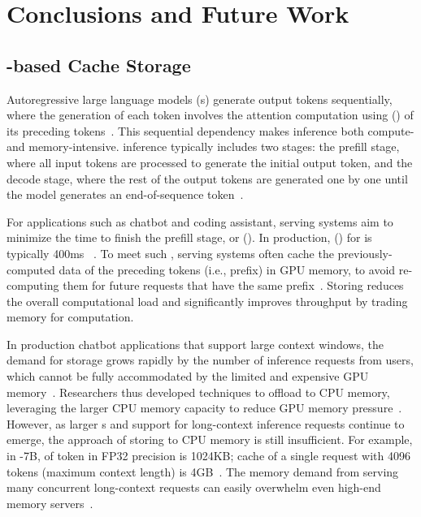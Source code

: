 \chapter{Conclusions and Future Work}
\label{chap:future}

\section{\cxl-based \kv Cache Storage}
\label{sec:cxlkv}

Autoregressive large language models (\llm{}s) generate output tokens sequentially, where the generation of each token involves the attention computation using \kvfull (\kv) of its preceding tokens~\cite{gpt1, gpt2, gpt3}. 
This sequential dependency makes \llm inference both compute- and memory-intensive.
\llm inference typically includes two stages: the prefill stage, where all input tokens are processed to generate the initial output token, and the decode stage, where the rest of the output tokens are generated one by one until the model generates an end-of-sequence token~\cite{agrawal2023sarathi,distserve,patel2024splitwise}. 


For applications such as chatbot and coding assistant, \llm serving systems aim to minimize the time to finish the prefill stage, or \ttftfull (\ttft).
In production, \slofull (\slo) for \ttft is typically 400ms ~\cite{distserve}.
To meet such \slo, \llm serving systems often cache the previously-computed \kv data of the preceding tokens (i.e., prefix) in GPU memory, to avoid re-computing them for future requests that have the same prefix~\cite{pagedattenion, distserve, memserve}. 
Storing \kvcache reduces the overall computational load and significantly improves throughput by trading memory for computation. 


In production chatbot applications that support large context windows, the demand for \kvcache storage grows rapidly by the number of inference requests from users, which cannot be fully accommodated  by the limited and expensive GPU memory~\cite{miao2023towards}.
Researchers thus developed techniques to offload \kvcache to CPU memory, leveraging the larger CPU memory capacity to reduce GPU memory pressure~\cite{memserve, cacheblend,sheng2023flexgen}. 
However, as larger \llm{}s and support for long-context inference requests continue to emerge, the approach of storing \kvcache to CPU memory is still insufficient. 
For example, in -7B, \kvcache of token in FP32 precision is 1024KB; \kv cache of a single request with 4096 tokens (maximum context length) is 4GB~\cite{llama2}.
The memory demand from serving many concurrent long-context requests can easily overwhelm even high-end memory servers~\cite{pagedattenion,liu2023cachegen}. 

